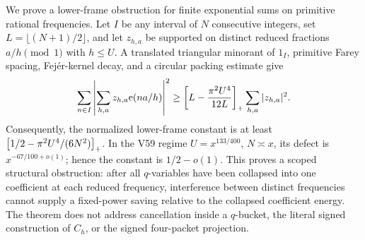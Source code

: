 We prove a lower-frame obstruction for finite exponential sums on primitive
rational frequencies.  Let \(I\) be any interval of \(N\) consecutive
integers, set \(L=\lfloor(N+1)/2\rfloor\), and let \(z_{h,a}\) be supported on
distinct reduced fractions \(a/h\pmod 1\) with \(h\leq U\).  A translated
triangular minorant of \(1_I\), primitive Farey spacing, Fejér-kernel decay,
and a circular packing estimate give
\[
\sum_{n\in I}\left|\sum_{h,a}z_{h,a}\mathrm{e}(na/h)\right|^2
\geq
\left[L-\frac{\pi^2U^4}{12L}\right]_{+}\sum_{h,a}|z_{h,a}|^2.
\]
Consequently, the normalized lower-frame constant is at least
\(\left[1/2-\pi^2U^4/(6N^2)\right]_{+}\).  In the V59 regime
\(U=x^{133/400}\), \(N\asymp x\), its defect is
\(x^{-67/100+o(1)}\); hence the constant is \(1/2-o(1)\).  This proves a
scoped structural obstruction: after all \(q\)-variables have been collapsed
into one coefficient at each reduced frequency, interference between distinct
frequencies cannot supply a fixed-power saving relative to the collapsed
coefficient energy.  The theorem does not address cancellation inside a
\(q\)-bucket, the literal signed construction of \(C_h\), or the signed
four-packet projection.
